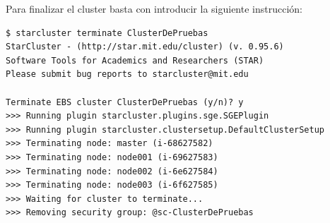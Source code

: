 \documentclass{article}
\begin{document}
	Para finalizar el cluster basta con introducir la siguiente instrucción:
\begin{lstlisting}[style=miniBash]
$ starcluster terminate ClusterDePruebas
StarCluster - (http://star.mit.edu/cluster) (v. 0.95.6)
Software Tools for Academics and Researchers (STAR)
Please submit bug reports to starcluster@mit.edu

Terminate EBS cluster ClusterDePruebas (y/n)? y
>>> Running plugin starcluster.plugins.sge.SGEPlugin
>>> Running plugin starcluster.clustersetup.DefaultClusterSetup
>>> Terminating node: master (i-68627582)
>>> Terminating node: node001 (i-69627583)
>>> Terminating node: node002 (i-6e627584)
>>> Terminating node: node003 (i-6f627585)
>>> Waiting for cluster to terminate... 
>>> Removing security group: @sc-ClusterDePruebas 
\end{lstlisting}
\end{document}
